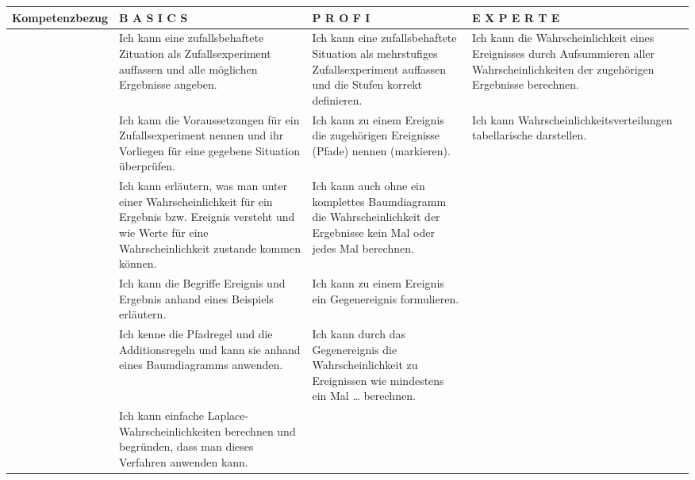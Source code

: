 \documentclass[11pt,twocolumn,oneside,openany,headings=optiontotoc,11pt,numbers=noenddot]{article}
\begin{document}
	\begin{landscape}
		\renewcommand{\arraystretch}{1.5}
		\begin{tabularx}{45\baselineskip}{|M|X|X|X|}
			\hline
			 \textbf{Kompetenzbezug} & \textbf{B A S I C S} & \textbf{P R O F I} & \textbf{E X P E R T E}\\
			\hline
			 & Ich kann eine zufallsbehaftete Zituation als Zufallsexperiment auffassen und alle möglichen Ergebnisse angeben. & Ich kann eine zufallsbehaftete Situation als mehrstufiges Zufallsexperiment auffassen und die Stufen korrekt definieren. & Ich kann die Wahrscheinlichkeit eines Ereignisses durch Aufsummieren aller Wahrscheinlichkeiten der zugehörigen Ergebnisse berechnen.\\
			& Ich kann die Voraussetzungen für ein Zufallsexperiment nennen und ihr Vorliegen für eine gegebene Situation überprüfen. & Ich kann zu einem Ereignis die zugehörigen Ereignisse (Pfade) nennen (markieren). & Ich kann Wahrscheinlichkeitsverteilungen tabellarische darstellen.\\
			& Ich kann erläutern, was man unter einer Wahrscheinlichkeit für ein Ergebnis bzw. Ereignis versteht und wie Werte für eine Wahrscheinlichkeit zustande kommen können. & Ich kann auch ohne ein komplettes Baumdiagramm die Wahrscheinlichkeit der Ergebnisse \glqq{}kein Mal\grqq{} oder \glqq{}jedes Mal\grqq{} berechnen. & \\
			& Ich kann die Begriffe Ereignis und Ergebnis anhand eines Beispiels erläutern. & Ich kann zu einem Ereignis ein Gegenereignis formulieren. & \\
			& Ich kenne die Pfadregel und die Additionsregeln und kann sie anhand eines Baumdiagramms anwenden. & Ich kann durch das Gegenereignis die Wahrscheinlichkeit zu Ereignissen wie \glqq{}mindestens ein Mal \ldots\grqq{} berechnen. & \\
			& Ich kann einfache Laplace-Wahrscheinlichkeiten berechnen und begründen, dass man dieses Verfahren anwenden kann. & & \\
			\hline
		\end{tabularx}
	\end{landscape}
\end{document}
